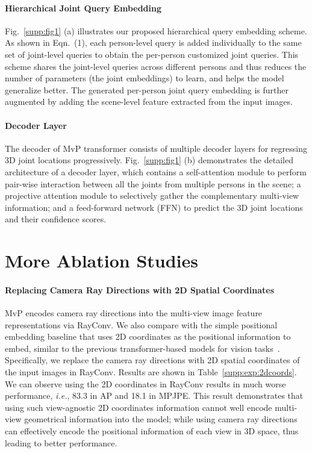 \documentclass{article}
\newcommand{\ie}{\emph{i.e.}}
\begin{document}
\paragraph{Hierarchical Joint Query Embedding}
Fig.~\ref{supp:fig1} (a) illustrates our proposed hierarchical query embedding scheme. As shown in Eqn.~(1), 
each person-level query is added individually to the same set of    joint-level queries to obtain the per-person customized joint queries. 
This scheme shares the joint-level queries   across different persons and thus reduces the number of   parameters (the joint embeddings) to learn, 
and helps the model generalize better. The  generated per-person joint query embedding is further augmented by adding  the scene-level feature extracted from the input images.





\paragraph{Decoder Layer}
The decoder of MvP transformer consists of multiple decoder layers for regressing 3D joint locations progressively.
Fig.~\ref{supp:fig1} (b) demonstrates the detailed architecture of a decoder layer, which contains
a self-attention module to perform
pair-wise interaction between all the joints from multiple persons in the scene; a projective attention module
to selectively gather the complementary multi-view information; and a feed-forward network (FFN) to
predict the 3D joint locations and their confidence scores.


\section*{More Ablation Studies}

\paragraph{Replacing Camera Ray Directions with 2D Spatial Coordinates}
MvP encodes camera ray directions into the multi-view image feature representations via RayConv. We also compare with the simple positional embedding baseline that uses 2D coordinates as the positional information to embed, similar to the previous transformer-based models for vision tasks~\cite{carion2020end,dosovitskiy2020image}. 
Specifically, we replace the camera ray directions with 2D spatial coordinates of the input images in RayConv. Results are shown in Table~\ref{supp:exp:2dcoords}. We can observe using the 2D coordinates in RayConv results in much worse performance, \ie, 83.3 in AP and 18.1 in MPJPE. This result demonstrates that using such view-agnostic 2D coordinates information cannot well encode multi-view geometrical information into the model; while using camera ray directions can effectively encode the positional information of each view in 3D space, thus leading to better performance. 
\end{document}

